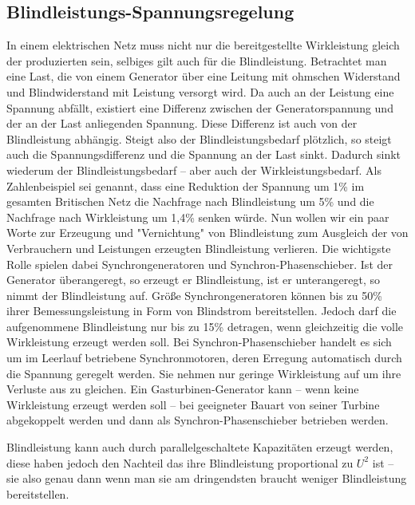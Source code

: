 \documentclass[10pt,a4paper]{article}
\begin{document}
\subsection{Blindleistungs-Spannungsregelung}
In einem elektrischen Netz muss nicht nur die bereitgestellte Wirkleistung gleich der produzierten sein, selbiges gilt auch für die Blindleistung.
Betrachtet man eine Last, die von einem Generator über eine Leitung mit ohmschen Widerstand und Blindwiderstand mit Leistung versorgt wird. Da auch an der Leistung eine Spannung abfällt, existiert eine Differenz zwischen der Generatorspannung und der an der Last anliegenden Spannung. Diese Differenz ist auch von der Blindleistung abhängig. Steigt also der Blindleistungsbedarf plötzlich, so steigt auch die Spannungsdifferenz und die Spannung an der Last sinkt. Dadurch sinkt wiederum der Blindleistungsbedarf – aber auch der Wirkleistungsbedarf.
Als Zahlenbeispiel sei genannt, dass eine Reduktion der Spannung um 1\% im gesamten Britischen Netz die Nachfrage nach Blindleistung um 5\% und die Nachfrage nach Wirkleistung um 1,4\% senken würde.
Nun wollen wir ein paar Worte zur Erzeugung und "Vernichtung" von Blindleistung zum Ausgleich der von Verbrauchern und Leistungen erzeugten Blindleistung verlieren. Die wichtigste Rolle spielen dabei Synchrongeneratoren und Synchron-Phasenschieber.
Ist der Generator überangeregt, %
so erzeugt er Blindleistung, ist er unterangeregt, so nimmt der Blindleistung auf. Größe Synchrongeneratoren können bis zu 50\% ihrer Bemessungsleistung in Form von Blindstrom bereitstellen. %
Jedoch darf die aufgenommene Blindleistung nur bis zu 15\% detragen, wenn gleichzeitig die volle Wirkleistung erzeugt werden soll.\cite{Harrison}	%
Bei Synchron-Phasenschieber handelt es sich um im Leerlauf betriebene Synchronmotoren, deren Erregung automatisch durch die Spannung geregelt werden. Sie nehmen nur geringe Wirkleistung auf um ihre Verluste aus zu gleichen. Ein Gasturbinen-Generator kann – wenn keine Wirkleistung erzeugt werden soll – bei geeigneter Bauart von seiner Turbine abgekoppelt werden und dann als Synchron-Phasenschieber betrieben werden.\cite{Harrison}

Blindleistung kann auch durch parallelgeschaltete Kapazitäten erzeugt werden, diese haben jedoch den Nachteil das ihre Blindleistung proportional zu $U^2$ ist – sie also genau dann wenn man sie am dringendsten braucht weniger Blindleistung bereitstellen.\cite{Harrison}
\end{document}
